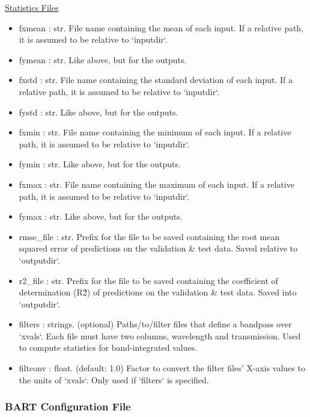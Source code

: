 \documentclass[letterpaper, 12pt]{article}
\begin{document}
\noindent \underline{Statistics Files}
\begin{itemize}
\item fxmean      : str.  File name containing the mean of each input.
                         If a relative path, it is assumed to be relative to `inputdir`.
\item fymean : str. Like above, but for the outputs.
\item fxstd     : str.  File name containing the standard deviation of each 
                   input.  If a relative path, it is assumed to be relative to `inputdir`.
\item fystd : str. Like above, but for the outputs.
\item fxmin : str.  File name containing the minimum of each input.
                         If a relative path, it is assumed to be relative to `inputdir`.
\item fymin : str. Like above, but for the outputs.
\item fxmax : str.  File name containing the maximum of each input.
                         If a relative path, it is assumed to be relative to `inputdir`.
\item fymax : str. Like above, but for the outputs.
\item rmse\_file  : str.  Prefix for the file to be saved containing the root mean 
                   squared error of predictions on the validation \& test data.
                   Saved relative to `outputdir`.
\item r2\_file    : str.  Prefix for the file to be saved containing the 
                   coefficient of determination (R\^2) of predictions on the 
                   validation \& test data.
                   Saved into `outputdir`.
\item filters : strings. (optional) Paths/to/filter files that define a 
                   bandpass over `xvals`. 
                   Each file must have two columns, wavelength and transmission.
                   Used to compute statistics for band-integrated values.
\item filtconv : float. (default: 1.0) Factor to convert the filter files' 
                       X-axis values to the units of `xvals`. 
                       Only used if `filters` is specified.
\end{itemize}



\subsubsection{BART Configuration File}
\label{sec:BARTconfig}
\end{document}
